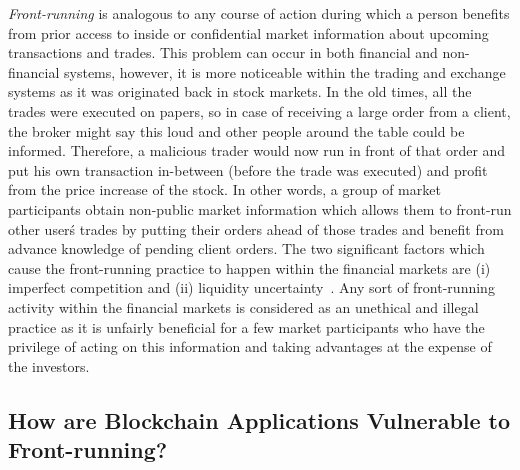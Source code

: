 \emph{Front-running} is analogous to any course of action during which a person benefits from prior access to inside or confidential market information about upcoming transactions and trades. This problem can occur in both financial and non-financial systems, however, it is more noticeable within the trading and exchange systems as it was originated back in stock markets. In the old times, all the trades were executed on papers, so in case of receiving a large order from a client, the broker might say this loud and other people around the table could be informed. Therefore, a malicious trader would now run in front of that order and put his own transaction in-between (before the trade was executed) and profit from the price increase of the stock. In other words, a group of market participants obtain non-public market information which allows them to front-run other user\'s trades by putting their orders ahead of those trades and benefit from advance knowledge of pending client orders. The two significant factors which cause the front-running practice to happen within the financial markets are (i) imperfect competition and (ii) liquidity uncertainty~\cite{liang2005distressed}. Any sort of front-running activity within the financial markets is considered as an unethical and illegal practice as it is unfairly beneficial for a few market participants who have the privilege of acting on this information and taking advantages at the expense of the investors. 

\subsection{How are Blockchain Applications Vulnerable to Front-running?} 
\label{sec:Front Running on the Blockchains}

